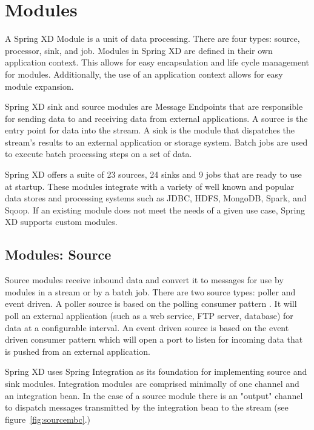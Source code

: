 \section{Modules}
\label{sec:Modules}
A Spring XD Module is a unit of data processing. There are four
types: source, processor, sink, and job. Modules in Spring XD are defined in their
own application context. This allows for easy encapsulation and life cycle management
for modules. Additionally, the use of an application context allows for easy module
expansion.

Spring XD sink and source modules are Message Endpoints 
\cite{enterprise-integration-pattern-message-endpoint} 
that are responsible for sending data to and receiving data from external applications.
A source is the entry point for data into the stream. A sink is the module that dispatches
the stream's results to an external application or storage system. Batch jobs are used to
execute batch processing steps on a set of data.

\par

Spring XD offers a suite of 23 sources, 24 sinks and 9 jobs that are ready to use at startup.
These modules integrate with a variety of well known and popular data stores
and processing systems such as JDBC, HDFS, MongoDB, Spark, and Sqoop.
If an existing module does not meet the needs of a given use case, Spring XD supports custom
modules.

\par

\subsection{Modules: Source}
Source modules receive inbound data and convert it to messages for
use by modules in a stream or by a batch job.
There are two source types: poller and event driven.  A poller source is based on the polling
consumer pattern \cite{enterprise-integration-pattern-pollingconsumer}. It
will poll an external application (such as a web service, FTP server, database) for data at a
configurable interval. An event driven source is based on the event driven
consumer pattern \cite{enterprise-integration-pattern-eventdrivenconsumer} which will
open a port to listen for incoming data that is pushed from an external application.

\par

Spring XD uses Spring Integration \cite{spring-integration-reference} as its foundation
for implementing source and sink modules. Integration modules are
comprised minimally of one channel and an integration bean.  In the case of a source module
there is an "output" channel to dispatch messages transmitted by the integration bean to
the stream (see figure~\ref{fig:sourcembc}.)


